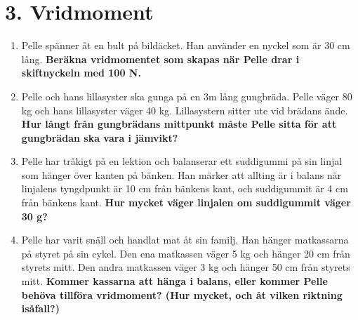 \documentclass[11pt]{article}
\newcommand{\lessonNumber}{3}
\newcommand{\lessonName}{Vridmoment}
\begin{document}
\raggedright


\section*{\lessonNumber. \lessonName}
\begin{enumerate}[itemsep=2em]
        \item
              \begin{minipage}[t]{0.5\textwidth}
                      Pelle spänner åt en bult på bildäcket. Han använder en nyckel som är 30 cm lång. \textbf{Beräkna vridmomentet som skapas när Pelle drar i skiftnyckeln med 100 N.}
              \end{minipage}
              \hfill
              \begin{adjustbox}{valign=t}
                      
              \end{adjustbox}
        \item
              Pelle och hans lillasyster ska gunga på en 3m lång gungbräda. Pelle väger 80 kg och hans lillasyster väger 40 kg. Lillasystern sitter ute vid brädans ände. \textbf{Hur långt från gungbrädans mittpunkt måste Pelle sitta för att gungbrädan ska vara i jämvikt?}
              \begin{center}
                      
              \end{center}

        \item
              Pelle har tråkigt på en lektion och balanserar ett suddigummi på sin linjal som hänger över kanten på bänken. Han märker att allting är i balans när linjalens tyngdpunkt är 10 cm från bänkens kant, och suddigummit är 4 cm från bänkens kant. \textbf{Hur mycket väger linjalen om suddigummit väger 30 g?}
              \begin{center}
                      
              \end{center}

        \item
              \begin{minipage}[t]{0.5\textwidth}
                      Pelle har varit snäll och handlat mat åt sin familj. Han hänger matkassarna på styret på sin cykel. Den ena matkassen väger 5 kg och hänger 20 cm från styrets mitt. Den andra matkassen väger 3 kg och hänger 50 cm från styrets mitt. \textbf{Kommer kassarna att hänga i balans, eller kommer Pelle behöva tillföra vridmoment? (Hur mycket, och åt vilken riktning isåfall?)}
              \end{minipage}
              \hfill
              \begin{adjustbox}{valign=t}
                      
              \end{adjustbox}


\end{enumerate}
\end{document}
